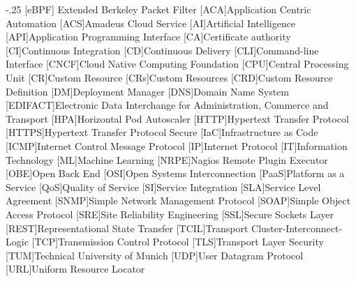\documentclass[headsepline,footsepline,footinclude=false,oneside,fontsize=11pt,paper=a4,listof=totoc,bibliography=totoc]{scrbook} %
\begin{document}


\frontmatter{}





\tableofcontents{}

\mainmatter{}

% 










\appendix{}


\begin{acronym}
	\itemsep-.25\baselineskip
	[eBPF]{ Extended Berkeley Packet Filter}
	[ACA]{Application Centric Automation}
	[ACS]{Amadeus Cloud Service}
	[AI]{Artificial Intelligence}
	[API]{Application Programming Interface}
	[CA]{Certificate authority}
	[CI]{Continuous Integration}
	[CD]{Continuous Delivery}
	[CLI]{Command-line Interface}
	[CNCF]{Cloud Native Computing Foundation}
	[CPU]{Central Processing Unit}
	[CR]{Custom Resource}
	[CRs]{Custom Resources}
	[CRD]{Custom Resource Definition}
	[DM]{Deployment Manager}
	[DNS]{Domain Name System}
	[EDIFACT]{Electronic Data Interchange for Administration, Commerce and Transport}
	[HPA]{Horizontal Pod Autoscaler}
	[HTTP]{Hypertext Transfer Protocol}
	[HTTPS]{Hypertext Transfer Protocol Secure}
	[IaC]{Infrastructure as Code}
	[ICMP]{Internet Control Message Protocol}
	[IP]{Internet Protocol}
	[IT]{Information Technology}
	[ML]{Machine Learning}
	[NRPE]{Nagios Remote Plugin Executor}
	[OBE]{Open Back End}
	[OSI]{Open Systems Interconnection}
	[PaaS]{Platform as a Service}
	[QoS]{Quality of Service}
	[SI]{Service Integration}
	[SLA]{Service Level Agreement}
	[SNMP]{Simple Network Management Protocol}
	[SOAP]{Simple Object Access Protocol}
	[SRE]{Site Reliability Engineering}
	[SSL]{Secure Sockets Layer}
	[REST]{Representational State Transfer}
	[TCIL]{Transport Cluster-Interconnect-Logic}
	[TCP]{Transmission Control Protocol}
	[TLS]{Transport Layer Security}
	[TUM]{Technical University of Munich}
	[UDP]{User Datagram Protocol}
	[URL]{Uniform Resource Locator}
\end{acronym}

\listoffigures{}
\printbibliography{}
\end{document}
